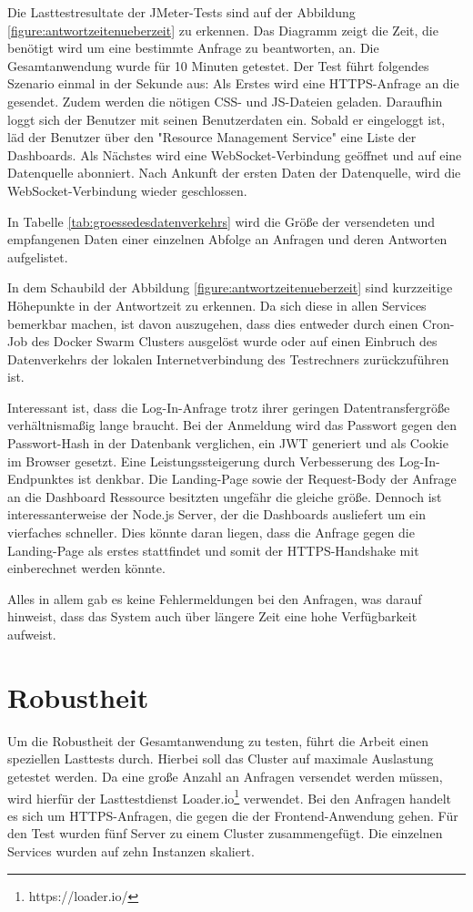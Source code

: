 Die Lasttestresultate der JMeter-Tests sind auf der Abbildung \ref{figure:antwortzeitenueberzeit}
zu erkennen. Das Diagramm zeigt die Zeit, die benötigt wird um eine bestimmte Anfrage zu beantworten, an.
Die Gesamtanwendung wurde für 10 Minuten getestet.
Der Test führt folgendes Szenario einmal in der Sekunde aus:
Als Erstes wird eine HTTPS-Anfrage an die  gesendet.
Zudem werden die nötigen CSS- und JS-Dateien geladen.
Daraufhin loggt sich der Benutzer mit seinen Benutzerdaten ein.
Sobald er eingeloggt ist, läd der Benutzer über den "Resource Management Service"
eine Liste der \foreignlanguage{english}{Dashboards}. Als Nächstes wird eine WebSocket-Verbindung geöffnet
und auf eine Datenquelle abonniert. Nach Ankunft der ersten Daten der
Datenquelle, wird die WebSocket-Verbindung wieder geschlossen.

In Tabelle \ref{tab:groessedesdatenverkehrs} wird die Größe der versendeten und empfangenen 
Daten einer einzelnen Abfolge an Anfragen und deren Antworten aufgelistet.

In dem Schaubild der Abbildung \ref{figure:antwortzeitenueberzeit}
sind kurzzeitige Höhepunkte in der Antwortzeit zu erkennen. Da sich diese
in allen Services bemerkbar machen, ist davon auszugehen, dass dies
entweder durch einen Cron-Job des Docker Swarm Clusters ausgelöst wurde oder auf einen
Einbruch des Datenverkehrs der lokalen Internetverbindung des Testrechners zurückzuführen
ist.

Interessant ist, dass die Log-In-Anfrage trotz ihrer geringen Datentransfergröße verhältnismaßig
lange braucht. Bei der Anmeldung wird das Passwort gegen den Passwort-Hash in der Datenbank verglichen,
ein JWT generiert und als Cookie im Browser gesetzt. Eine Leistungssteigerung durch Verbesserung
des Log-In-Endpunktes ist denkbar. Die Landing-Page  sowie der Request-Body der
Anfrage an die Dashboard Ressource besitzten ungefähr die gleiche größe. Dennoch ist interessanterweise
der Node.js Server, der die \foreignlanguage{english}{Dashboards} ausliefert um ein vierfaches schneller. Dies könnte daran liegen,
dass die Anfrage gegen die Landing-Page als erstes stattfindet und somit der HTTPS-Handshake
mit einberechnet werden könnte.

Alles in allem gab es keine Fehlermeldungen bei den Anfragen, was darauf hinweist, dass das System
auch über längere Zeit eine hohe Verfügbarkeit aufweist.

\section{Robustheit}
\label{sec:robustheit}
Um die Robustheit der Gesamtanwendung zu testen, führt die Arbeit
einen speziellen Lasttests durch. Hierbei soll das Cluster auf maximale
Auslastung getestet werden. Da eine große Anzahl an Anfragen versendet werden müssen,
wird hierfür der Lasttestdienst Loader.io\footnote{https://loader.io/} verwendet.
Bei den Anfragen handelt es sich um HTTPS-Anfragen, die gegen
die  der Frontend-Anwendung gehen. Für den Test
wurden fünf Server zu einem Cluster zusammengefügt. Die einzelnen Services wurden
auf zehn Instanzen skaliert.

